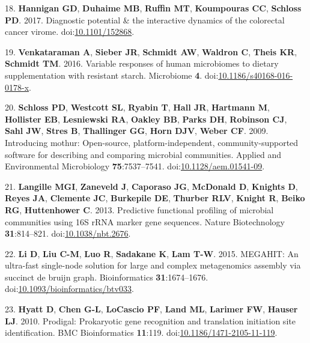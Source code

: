 \documentclass[11pt,]{article}
\begin{document}
\leavevmode\hypertarget{ref-Hannigan2017}{}%
18. \textbf{Hannigan GD}, \textbf{Duhaime MB}, \textbf{Ruffin MT},
\textbf{Koumpouras CC}, \textbf{Schloss PD}. 2017. Diagnostic potential
\& the interactive dynamics of the colorectal cancer virome.
doi:\href{https://doi.org/10.1101/152868}{10.1101/152868}.

\leavevmode\hypertarget{ref-Venkataraman2016}{}%
19. \textbf{Venkataraman A}, \textbf{Sieber JR}, \textbf{Schmidt AW},
\textbf{Waldron C}, \textbf{Theis KR}, \textbf{Schmidt TM}. 2016.
Variable responses of human microbiomes to dietary supplementation with
resistant starch. Microbiome \textbf{4}.
doi:\href{https://doi.org/10.1186/s40168-016-0178-x}{10.1186/s40168-016-0178-x}.

\leavevmode\hypertarget{ref-Schloss2009}{}%
20. \textbf{Schloss PD}, \textbf{Westcott SL}, \textbf{Ryabin T},
\textbf{Hall JR}, \textbf{Hartmann M}, \textbf{Hollister EB},
\textbf{Lesniewski RA}, \textbf{Oakley BB}, \textbf{Parks DH},
\textbf{Robinson CJ}, \textbf{Sahl JW}, \textbf{Stres B},
\textbf{Thallinger GG}, \textbf{Horn DJV}, \textbf{Weber CF}. 2009.
Introducing mothur: Open-source, platform-independent,
community-supported software for describing and comparing microbial
communities. Applied and Environmental Microbiology
\textbf{75}:7537--7541.
doi:\href{https://doi.org/10.1128/aem.01541-09}{10.1128/aem.01541-09}.

\leavevmode\hypertarget{ref-Langille2013}{}%
21. \textbf{Langille MGI}, \textbf{Zaneveld J}, \textbf{Caporaso JG},
\textbf{McDonald D}, \textbf{Knights D}, \textbf{Reyes JA},
\textbf{Clemente JC}, \textbf{Burkepile DE}, \textbf{Thurber RLV},
\textbf{Knight R}, \textbf{Beiko RG}, \textbf{Huttenhower C}. 2013.
Predictive functional profiling of microbial communities using 16S rRNA
marker gene sequences. Nature Biotechnology \textbf{31}:814--821.
doi:\href{https://doi.org/10.1038/nbt.2676}{10.1038/nbt.2676}.

\leavevmode\hypertarget{ref-Li2015}{}%
22. \textbf{Li D}, \textbf{Liu C-M}, \textbf{Luo R}, \textbf{Sadakane
K}, \textbf{Lam T-W}. 2015. MEGAHIT: An ultra-fast single-node solution
for large and complex metagenomics assembly via succinct de bruijn
graph. Bioinformatics \textbf{31}:1674--1676.
doi:\href{https://doi.org/10.1093/bioinformatics/btv033}{10.1093/bioinformatics/btv033}.

\leavevmode\hypertarget{ref-Hyatt2010}{}%
23. \textbf{Hyatt D}, \textbf{Chen G-L}, \textbf{LoCascio PF},
\textbf{Land ML}, \textbf{Larimer FW}, \textbf{Hauser LJ}. 2010.
Prodigal: Prokaryotic gene recognition and translation initiation site
identification. BMC Bioinformatics \textbf{11}:119.
doi:\href{https://doi.org/10.1186/1471-2105-11-119}{10.1186/1471-2105-11-119}.
\end{document}
